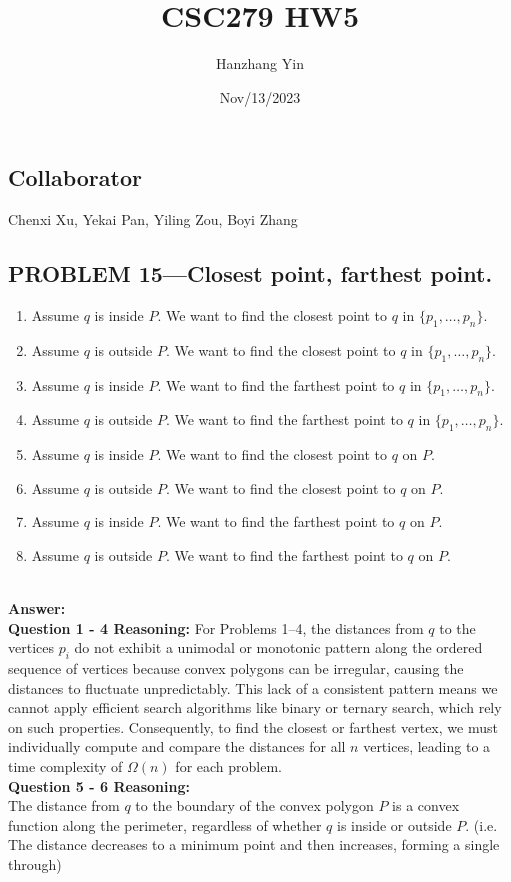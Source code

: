 \documentclass{article}
\title{CSC279 HW5}
\author{Hanzhang Yin}
\date{Nov/13/2023}
\begin{document}
\maketitle

\subsection*{Collaborator}
Chenxi Xu, Yekai Pan, Yiling Zou, Boyi Zhang

\subsection*{PROBLEM 15---Closest point, farthest point.}

\begin{enumerate}
    \item Assume $q$ is inside $P$. We want to find the closest point to $q$ in $\{p_1, \dots, p_n\}$.
    \item Assume $q$ is outside $P$. We want to find the closest point to $q$ in $\{p_1, \dots, p_n\}$.
    \item Assume $q$ is inside $P$. We want to find the farthest point to $q$ in $\{p_1, \dots, p_n\}$.
    \item Assume $q$ is outside $P$. We want to find the farthest point to $q$ in $\{p_1, \dots, p_n\}$.
    \item Assume $q$ is inside $P$. We want to find the closest point to $q$ on $P$.
    \item Assume $q$ is outside $P$. We want to find the closest point to $q$ on $P$.
    \item Assume $q$ is inside $P$. We want to find the farthest point to $q$ on $P$.
    \item Assume $q$ is outside $P$. We want to find the farthest point to $q$ on $P$.
\end{enumerate}
\\
\textbf{Answer: }
\\
\textbf{Question 1 - 4 Reasoning: }
For Problems 1--4, the distances from \( q \) to the vertices \( p_i \) do not exhibit a unimodal or monotonic pattern along the ordered sequence of vertices because convex polygons can be irregular, causing the distances to fluctuate unpredictably. This lack of a consistent pattern means we cannot apply efficient search algorithms like binary or ternary search, which rely on such properties. Consequently, to find the closest or farthest vertex, we must individually compute and compare the distances for all \( n \) vertices, leading to a time complexity of \( \Omega(n) \) for each problem.
\\
\textbf{Question 5 - 6 Reasoning: }
\\
The distance from $q$ to the boundary of the convex polygon $P$ is a convex function along the perimeter, regardless of whether $q$ is inside or outside $P$.
(i.e. The distance decreases to a minimum point and then increases, forming a single through)
\end{document}
